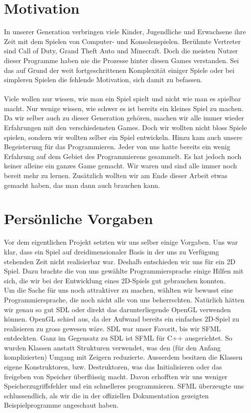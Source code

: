 \documentclass[11pt,a4paper]{scrbook}
\begin{document}
\section{Motivation}
In unserer Generation verbringen viele Kinder, Jugendliche und Erwachsene
ihre Zeit mit dem Spielen von Computer- und Konsolenspielen.
Berühmte Vertreter sind Call of Duty, Grand Theft Auto und Minecraft.
Doch die meisten Nutzer dieser Programme haben nie die Prozesse hinter diesen Games verstanden.
Sei das auf Grund der weit fortgeschrittenen Komplexität einiger Spiele
oder bei simpleren Spielen die fehlende Motivation, sich damit zu befassen.\\
\\
Viele wollen nur wissen, wie man ein Spiel spielt und nicht wie man es spielbar macht. Nur wenige wissen, wie schwer es ist bereits ein kleines Spiel zu machen. 
Da wir selber auch zu dieser Generation gehören, 
machen wir alle immer wieder Erfahrungen mit den verschiedensten Games.
Doch wir wollten nicht bloss Spiele spielen, 
sondern wir wollten selber ein Spiel entwickeln.
Hinzu kam auch unsere Begeisterung für das Programmieren.
Jeder von uns hatte bereits ein wenig Erfahrung auf dem Gebiet des Programmierens gesammelt. 
Es hat jedoch noch keiner alleine
ein ganzes Game gemacht.
Wir waren und sind alle immer noch bereit mehr zu lernen.
Zusätzlich wollten wir am Ende dieser Arbeit etwas gemacht haben, das man dann auch brauchen kann.

\section{Persönliche Vorgaben}

Vor dem eigentlichen Projekt setzten wir uns selber einige Vorgaben.
Uns war klar, dass ein Spiel auf dreidimensionaler Basis in der uns zu Verfügung stehenden Zeit nicht realisierbar war. Deshalb entschieden wir uns für ein 2D Spiel.
Dazu brachte die von uns gewählte Programmiersprache einige Hilfen mit sich, die wir bei der Entwicklung eines 2D-Spiels gut gebrauchen konnten.
\\
Um die Sache für uns noch attraktiver zu machen, wählten wir bewusst eine Programmiersprache, die noch nicht alle von uns beherrschten. 
Natürlich hätten wir genau so gut SDL oder direkt das darunterliegende OpenGL verwenden können. 
OpenGL schied aus, da der Aufwand bereits ein einfaches 2D-Spiel zu realisieren zu gross gewesen wäre. 
SDL war unser Favorit, bis wir SFML entdeckten. 
Ganz im Gegensatz zu SDL ist SFML für C++ ausgerichtet. 
So wurden Klassen anstatt Strukturen verwendet, was den (für den
Anfang komplizierten) Umgang mit Zeigern reduzierte. 
Ausserdem besitzen die Klassen eigene Konstruktoren, bzw. Destruktoren, was das Initialisieren
oder das freigeben von Speicher überflüssig macht. 
Davon erhofften wir uns weniger Speicherzugriffsfehler und ein schnelleres programmieren. 
SFML überzeugte uns schlussendlich, als wir die in der offiziellen Dokumentation gezeigten Beispielprogramme angeschaut haben. 
\end{document}
